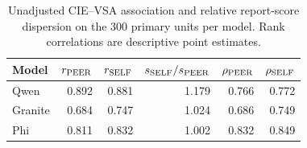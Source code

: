 \begin{table}[!htbp]
\centering\small
\caption{Unadjusted CIE--VSA association and relative report-score dispersion on the 300 primary units per model. Rank correlations are descriptive point estimates.}
\label{tab:correlations}
\renewcommand{\arraystretch}{1.25}
\begin{tabular}{@{}lrrrrr@{}}
\toprule
Model & $r_{\rm PEER}$ & $r_{\rm SELF}$ & $s_{\rm SELF}/s_{\rm PEER}$ & $\rho_{\rm PEER}$ & $\rho_{\rm SELF}$\\
\midrule
Qwen & 0.892 & 0.881 & 1.179 & 0.766 & 0.772\\
Granite & 0.684 & 0.747 & 1.024 & 0.686 & 0.749\\
Phi & 0.811 & 0.832 & 1.002 & 0.832 & 0.849\\
\bottomrule
\end{tabular}
\end{table}
